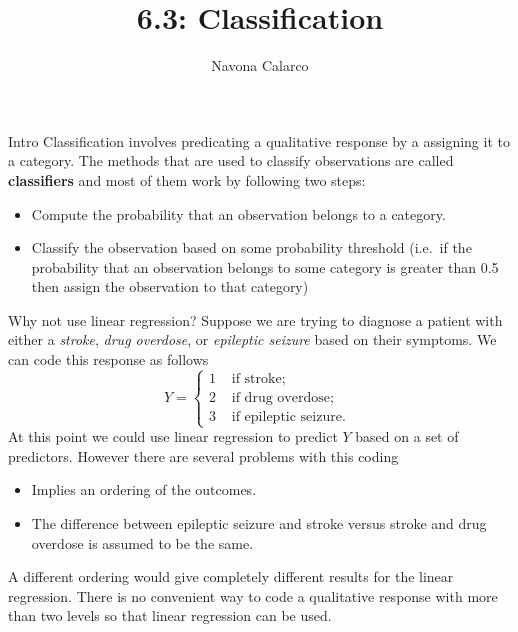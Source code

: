 \documentclass[
  ignorenonframetext,
  aspectratio=169,
]{beamer}
\title{6.3: Classification}
\author{Navona Calarco}
\date{}
\institute{The University of Toronto}
\begin{document}
\frame{\titlepage}
\ifdefined\Shaded\renewenvironment{Shaded}{\begin{tcolorbox}[borderline west={3pt}{0pt}{shadecolor}, sharp corners, enhanced, boxrule=0pt, breakable, frame hidden, interior hidden]}{\end{tcolorbox}}\fi

\begin{frame}{Intro}
\protect\hypertarget{intro}{}
Classification involves predicating a qualitative response by a
assigning it to a category. The methods that are used to classify
observations are called \textbf{classifiers} and most of them work by
following two steps:

\begin{itemize}
\item
  Compute the probability that an observation belongs to a category.
\item
  Classify the observation based on some probability threshold (i.e.~if
  the probability that an observation belongs to some category is
  greater than 0.5 then assign the observation to that category)
\end{itemize}
\end{frame}

\begin{frame}{Why not use linear regression?}
\protect\hypertarget{why-not-use-linear-regression}{}
Suppose we are trying to diagnose a patient with either a \emph{stroke},
\emph{drug overdose}, or \emph{epileptic seizure} based on their
symptoms. We can code this response as follows \[
    Y=\left\{\begin{array}{ll}
1 & \text { if stroke; } \\
2 & \text { if drug overdose; } \\
3 & \text { if epileptic seizure. }
\end{array}\right.
\] At this point we could use linear regression to predict \(Y\) based
on a set of predictors. However there are several problems with this
coding

\begin{itemize}
\item
  Implies an ordering of the outcomes.
\item
  The difference between epileptic seizure and stroke versus stroke and
  drug overdose is assumed to be the same.
\end{itemize}

A different ordering would give completely different results for the
linear regression.
\alert{There is no convenient way to code a qualitative response with more than two levels so that linear regression can be used.}
\end{frame}
\end{document}
